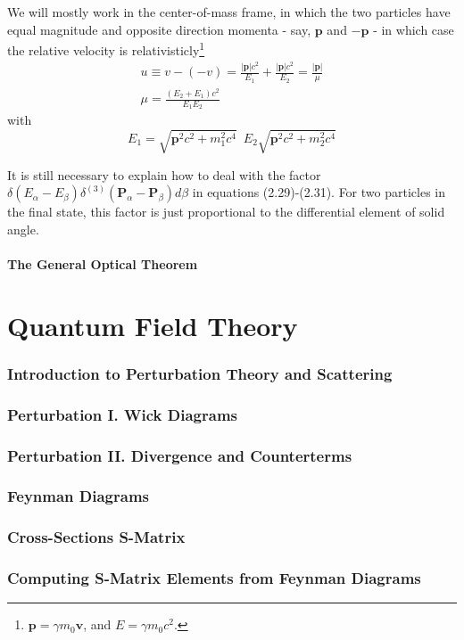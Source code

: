 \documentclass[12pt]{article}
\numberwithin{equation}{section}
\begin{document}
We will mostly work in the center-of-mass frame, in which the two particles have equal magnitude and opposite direction momenta - say, $\mathbf{p}$ and $-\mathbf{p}$ - in which case the relative velocity is relativisticly\footnote{$\mathbf{p} = \gamma m_0\mathbf{v}$, and $E=\gamma m_0c^2$.}
\begin{equation}
    \begin{split}
        u \equiv v-(-v) = \frac{|\mathbf{p}|c^2}{E_1}+\frac{|\mathbf{p}|c^2}{E_2} = \frac{|\mathbf{p}|}{\mu}\\
        \mu = \frac{(E_{2}+E_{1})c^2}{E_{1}E_{2}}
    \end{split}
\end{equation}
with 
\[E_1 = \sqrt{\mathbf{p}^2c^2+m_1^2c^4}\,\,\,E_2\sqrt{\mathbf{p}^2c^2+m_2^2c^4}\]

It is still necessary to explain how to deal with the factor $\delta(E_{\alpha}-E_{\beta})\delta^{(3)}(\mathbf{P}_{\alpha}-\mathbf{P}_{\beta})d\beta$ in equations (2.29)-(2.31).
For two particles in the final state, this factor is just proportional to the differential element of solid angle.

\subsection{The General Optical Theorem}

\part{Quantum Field Theory}
\section{Introduction to Perturbation Theory and Scattering} 
\section{Perturbation I. Wick Diagrams}
\section{Perturbation II. Divergence and Counterterms}
\section{Feynman Diagrams}
\section{Cross-Sections S-Matrix}
\section{Computing S-Matrix Elements from Feynman Diagrams}
\end{document}
